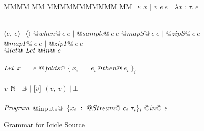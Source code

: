 
\begin{figure}

\begin{tabbing}
MMMM \= MM \= MMMMMMMMMMM \= MM \= \kill
$\mathit{e}$
\GrammarDef $x$
\> $|$ \> $v$
\GrammarAlt $e~e$
\> $|$ \> $\lambda{}x~:~\tau.~e$

\\
\GrammarAlt $\langle e,~ e \rangle ~|~ \langle\rangle$
\GrammarAlt $@when@~e~e$
\> $|$ \> $@sample@~e~e$
\GrammarAlt $@mapS@~e~e$
\> $|$ \> $@zipS@~e~e$
\GrammarAlt $@mapF@~e~e$
\> $|$ \> $@zipF@~e~e$
\\
\GrammarAlt $@let@~\mathit{Let}~@in@~e$
\\
\\

$\mathit{Let}$
\GrammarDef $x~=~e$
\GrammarAlt $@folds@~\{~x_i~=~e_i~@then@~e_i~\}_i$
\\
\\

$\mathit{v}$
\GrammarDef $\mathbb{N} ~|~ \mathbb{B} ~|~ [v]$
\GrammarAlt $(v,~v) ~|~ \bot$
\\
\\


$\mathit{Program}$
\GrammarDef @inputs@~$\{ x_i~:~@Stream@~c_i~\tau_i \}_i~@in@~\mathit{e}$ \\
\end{tabbing}

\caption{Grammar for Icicle Source}
\label{fig:source:grammar}
\end{figure}

